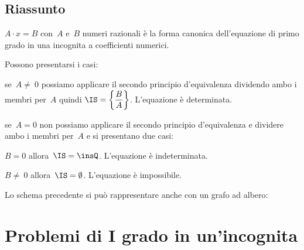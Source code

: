 \subsection{Riassunto}
$A\cdot x=B$ con~$A$ e~$B$ numeri
razionali è la forma canonica dell'equazione di primo grado in una
incognita a coefficienti numerici.%

Possono presentarsi i casi:
 \begin{itemize*}
 \item se~$A\neq~0$ possiamo applicare il secondo principio
d'equivalenza dividendo ambo i membri per~$A$ quindi
$\IS =\left\{\dfrac{B}{A}\right\}$. L'equazione
è determinata.

 \item se~$A=0$ non possiamo applicare il secondo principio
d'equivalenza e dividere ambo i membri per~$A$ e si
presentano due casi:

\begin{itemize*}
 \item $B=0$ allora~$\IS =\insQ$. L'equazione
è indeterminata.

\item $B\neq~0$ allora~$\IS =\emptyset $.
L'equazione è impossibile.
\end{itemize*}


 \end{itemize*}

Lo schema precedente si può rappresentare anche con un grafo ad
albero:
\begin{center}
 
\end{center}





\section{Problemi di I grado in un'incognita}
\label{sec:equazioni_problemi}

